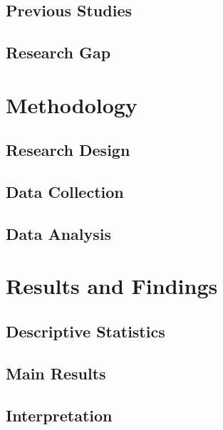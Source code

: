 \documentclass[12pt,a4paper]{report}
\begin{document}
\section{Previous Studies}
\label{sec:previous}
\lipsum[18-20]

\section{Research Gap}
\label{sec:gap}
\lipsum[21-22]

\chapter{Methodology}
\label{chap:methodology}

\section{Research Design}
\label{sec:design}
\lipsum[23-25]

\section{Data Collection}
\label{sec:data}
\lipsum[26-28]

\section{Data Analysis}
\label{sec:analysis}
\lipsum[29-31]

\chapter{Results and Findings}
\label{chap:results}

\section{Descriptive Statistics}
\label{sec:descriptive}
\lipsum[32-34]

\section{Main Results}
\label{sec:mainresults}
\lipsum[35-37]

\section{Interpretation}
\label{sec:interpretation}
\lipsum[38-40]
\end{document}
